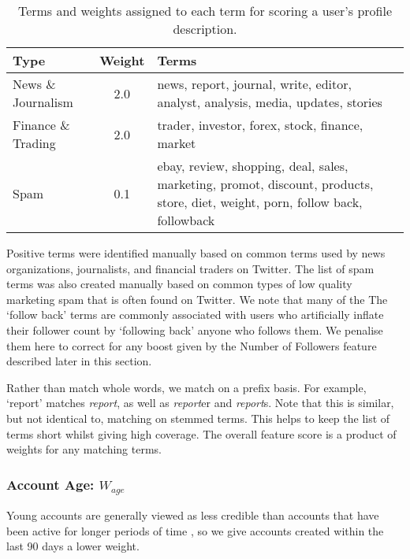 \begin{table}[h!]

	\caption{Terms and weights assigned to each term for scoring a user's profile description. }

	\begin{tabulary}{\textwidth}{l c L}
	\toprule
	\textbf{Type} &\textbf{Weight} & \textbf{Terms} \\
	\midrule

	News \& Journalism & 2.0 & news, report, journal, write, editor, analyst, analysis, media, updates, stories \\

	Finance \& Trading & 2.0 & trader, investor, forex, stock, finance, market \\

	Spam & 0.1 & ebay, review, shopping, deal, sales, marketing, promot, discount, products, store, diet, weight, porn, follow back, followback \\

	\bottomrule
	\end{tabulary}
	\label{scoring:table:authorKeywordsWeights}

\end{table}

Positive terms were identified manually based on common terms used by news organizations, journalists, and financial traders on Twitter. The list of spam terms was also created manually based on common types of low quality marketing spam that is often found on Twitter. We note that many of the The `follow back' terms are commonly associated with users who artificially inflate their follower count by `following back' anyone who follows them. We penalise them here to correct for any boost given by the Number of Followers feature described later in this section.

Rather than match whole words, we match on a prefix basis. For example, `report' matches \emph{report}, as well as \emph{report}er and \emph{report}s. Note that this is similar, but not identical to, matching on stemmed terms. This helps to keep the list of terms short whilst giving high coverage. The overall feature score is a product of weights for any matching terms.

\subsubsection{Account Age: \(W_{age}\)}
Young accounts are generally viewed as less credible than accounts that have been active for longer periods of time \citep{Sikdar13}, so we give accounts created within the last 90 days a lower weight.

